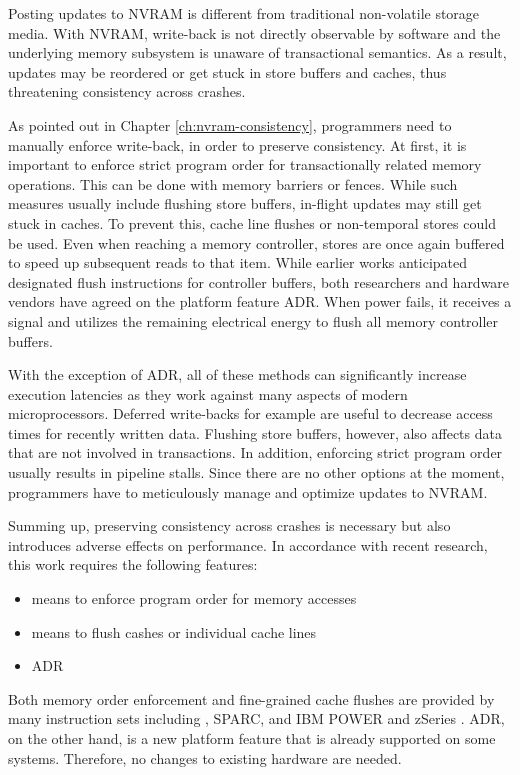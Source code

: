 Posting updates to \ac{NVRAM} is different from traditional non-volatile storage
media. With \ac{NVRAM}, write-back is not directly observable by software and
the underlying memory subsystem is unaware of transactional semantics. As a
result, updates may be reordered or get stuck in store buffers and caches, thus
threatening consistency across crashes.

As pointed out in Chapter \ref{ch:nvram-consistency}, programmers need to
manually enforce write-back, in order to preserve consistency. At first, it is
important to enforce strict program order for transactionally related memory
operations. This can be done with memory barriers or fences. While such measures
usually include flushing store buffers, in-flight updates may still get stuck in
caches. To prevent this, cache line flushes or non-temporal stores could be
used. Even when reaching a memory controller, stores are once again buffered to
speed up subsequent reads to that item. While earlier works anticipated
designated flush instructions for controller buffers, both researchers and
hardware vendors have agreed on the platform feature \ac{ADR}. When power fails,
it receives a signal and utilizes the remaining electrical energy to flush all
memory controller buffers.

With the exception of \ac{ADR}, all of these methods can significantly increase
execution latencies as they work against many aspects of modern microprocessors.
Deferred write-backs for example are useful to decrease access times for
recently written data. Flushing store buffers, however, also affects data that
are not involved in transactions. In addition, enforcing strict program order
usually results in pipeline stalls. Since there are no other options at the
moment, programmers have to meticulously manage and optimize updates to
\ac{NVRAM}.

Summing up, preserving consistency across crashes is necessary but also
introduces adverse effects on performance. In accordance with recent research,
this work requires the following features:

\begin{itemize}
    \item means to enforce program order for memory accesses
    \item means to flush cashes or individual cache lines
    \item \acl{ADR}
\end{itemize}

Both memory order enforcement and fine-grained cache flushes are provided by
many instruction sets including , SPARC, and IBM POWER and zSeries
\cite{mckenney2007memory}. \ac{ADR}, on the other hand, is a new platform
feature that is already supported on some systems. Therefore, no changes to
existing hardware are needed.
